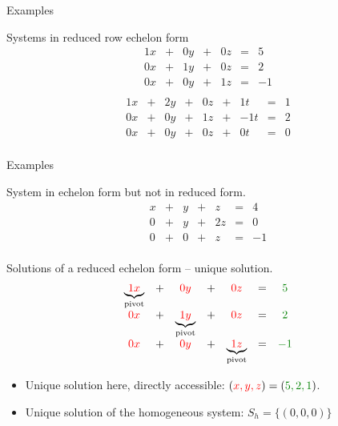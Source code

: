 \documentclass{beamer}
\begin{document}
\begin{frame}{Examples}
  
  \begin{exampleblock}{Systems in reduced row echelon form}
    \[
    \begin{array}{ccccccc}
    1x & + & 0y & + & 0z  & = & 5\\
    0x & + & 1y & + & 0z & = & 2\\
    0x & + & 0y & + & 1z  & = & -1\\    
    \end{array}
    \]\[
    \begin{array}{ccccccccc}
        1x & + & 2y & + & 0z  &  + & 1t & = & 1\\
        0x & + & 0y & +  &  1z  &  + & -1t & = & 2\\
        0x & + & 0y & +  &  0z  &  + & 0t & = & 0\\    
    \end{array}
    \]
  \end{exampleblock}
\end{frame}

\begin{frame}{Examples}

  \begin{exampleblock}{System in echelon form but not in reduced form.}
    \[\begin{array}{ccccccc}
    x & + & y & + & z  & = & 4\\
    0 & + & y & + & 2z & = & 0\\
    0 & + & 0 & + & z  & = & -1\\    
    \end{array}\]
  \end{exampleblock}
  
\end{frame}

\begin{frame}{Solutions of a reduced echelon form -- unique solution.}
  \[\begin{array}{ccccccc}
             \underbrace{ \color{red} 1x}_{\textnormal{pivot}} & + & {\color{red} 0 y} & + & {\color{red} 0z}  & = & {\color{darkgreen}5}\\
             {\color{red}0 x}& + & \underbrace{ \color{red} 1y}_{\textnormal{pivot}} & + &{\color{red}0z} & = & {\color{darkgreen}2}\\
             {\color{red}0 x}& + & {\color{red}0 y}& + & \underbrace{\color{red} 1z}_{\textnormal{pivot}}  & = & {\color{darkgreen}-1}\\    
  \end{array}\]

  \begin{itemize}
  \item<2-> Unique solution here, directly accessible: $({\color{red}x, y, z}) = ({\color{darkgreen} 5, 2, 1})$.
  \item<3-> Unique solution of the homogeneous system: $S_h = \{(0,0,0)\}$
  \end{itemize}

\end{frame}
\end{document}
